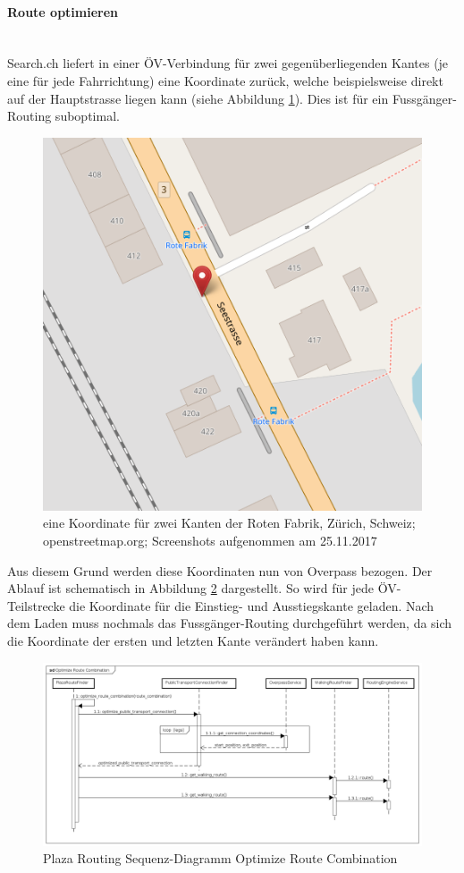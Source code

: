 \paragraph{Route optimieren}\label{impl:Plaza Routing Route optimieren}~\\
Search.ch \cite{search_ch_route_api} liefert in einer ÖV-Verbindung für zwei gegenüberliegenden \glspl{Kante} (je eine für jede Fahrrichtung) eine Koordinate zurück, welche beispielsweise direkt auf der Hauptstrasse liegen kann (siehe Abbildung \ref{fig:one_coordinate_for_two_stops}). Dies ist für ein Fussgänger-Routing suboptimal.

\begin{figure}[ht]
\centering
\includegraphics[width=0.5\linewidth]{projectdoc/img/one_coordinate_for_two_stops}
\caption[eine Koordinate für zwei Kanten]{eine Koordinate für zwei Kanten der Roten Fabrik, Zürich, Schweiz; openstreetmap.org; Screenshots aufgenommen am 25.11.2017}
\label{fig:one_coordinate_for_two_stops}
\end{figure}

Aus diesem Grund werden diese Koordinaten nun von Overpass \cite{wiki:overpass} bezogen. Der Ablauf ist schematisch in Abbildung \ref{fig:sequence_diagram_plaza_routing_optimize_route_comb} dargestellt. So wird für jede ÖV-Teilstrecke die Koordinate für die Einstieg- und Ausstiegskante geladen. Nach dem Laden muss nochmals das Fussgänger-Routing durchgeführt werden, da sich die Koordinate der ersten und letzten \gls{Kante} verändert haben kann.

\begin{figure}[ht]
\centering
\includegraphics[width=1\linewidth]{projectdoc/img/sequence_diagram_plaza_routing_optimize_route_comb}
\caption[Plaza Routing Sequenz-Diagramm Optimize Route Combination]{Plaza Routing Sequenz-Diagramm Optimize Route Combination}
\label{fig:sequence_diagram_plaza_routing_optimize_route_comb}
\end{figure}

